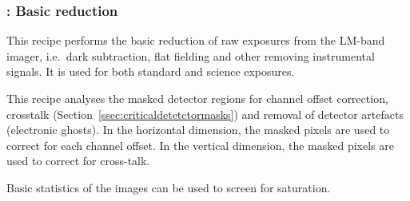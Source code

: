 \clearpage
\subsubsection{:  Basic reduction}
\label{lm_img_basic}
\label{rec:lm_img_basic}
\label{sssec:lm_img_basic}
\label{metis_lm_img_basic_reduce}
\label{rec:metis_lm_img_basic_reduce}
\label{sssec:metis_lm_img_basic_reduce}


This recipe performs the basic reduction of raw exposures from the
LM-band imager, i.e.\ dark subtraction, flat fielding and other removing
instrumental signals. It is used for both standard and science exposures.

This recipe analyses the masked detector regions for channel offset correction, crosstalk (Section~\ref{ssec:criticaldetetctormasks}) and removal of detector artefacts (electronic ghosts).
In the horizontal dimension, the masked pixels are used to correct for each channel offset.
In the vertical dimension, the masked pixels are used to correct for cross-talk.

Basic statistics of the images can be used to screen for saturation.

